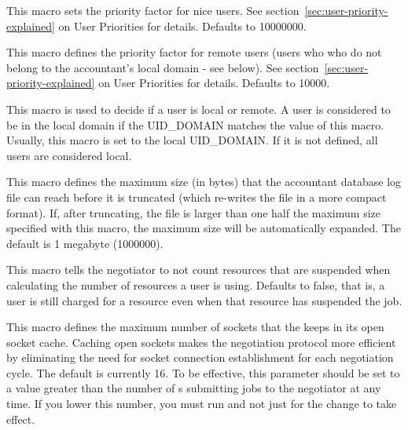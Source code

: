 \begin{description}
\label{param:NiceUserPrioFactor} 
\item[\Macro{NICE\_USER\_PRIO\_FACTOR}]
  This macro sets the priority factor for nice users. See
  section~\ref{sec:user-priority-explained}
  on User Priorities for details.  Defaults to 10000000.

\label{param:RemotePrioFactor} 
\item[\Macro{REMOTE\_PRIO\_FACTOR}]
  This macro defines the priority factor for remote users (users who
  who do not belong to the accountant's local domain - see
  below). See section~\ref{sec:user-priority-explained}
  on User Priorities for details.  Defaults to 10000.

\label{param:AccountantLocalDomain} 
\item[\Macro{ACCOUNTANT\_LOCAL\_DOMAIN}]
  This macro is used to decide if a user is local or remote. A user
  is considered to be in the local domain if the UID\_DOMAIN matches
  the value of this macro. Usually, this macro is set
  to the local UID\_DOMAIN. If it is not defined, all users are considered
  local.

\label{param:MaxAccountantDatabaseSize}
\item[\Macro{MAX\_ACCOUNTANT\_DATABASE\_SIZE}] 
  This macro defines the maximum size (in bytes) that the accountant
  database log file can reach before it is truncated (which re-writes
  the file in a more compact format).
  If, after truncating, the file is larger than one half the maximum
  size specified with this macro, the maximum size will be
  automatically expanded.
  The default is 1 megabyte (1000000).

\label{param:NegotiatorDiscountSuspendedResources} 
\item[\Macro{NEGOTIATOR\_DISCOUNT\_SUSPENDED\_RESOURCES}]
   This macro tells the negotiator to not count resources that are suspended
   when calculating the number of resources a user is using. 
   Defaults to false, that is, a user is still charged for a resource even
   when that resource has suspended the job.

\label{param:NegotiatorSocketCacheSize}
\item[\Macro{NEGOTIATOR\_SOCKET\_CACHE\_SIZE}]
  This macro defines the maximum number of sockets that the 
  keeps in its open socket cache.
  Caching open sockets makes the negotiation
  protocol more efficient by eliminating the need for socket
  connection establishment for each negotiation cycle.  The default is
  currently 16.  To be effective, this parameter should be set to a
  value greater than the number of s submitting jobs to the
  negotiator at any time.  If you lower this number, you must run
   and not just  for the change to
  take effect.


\end{description}
